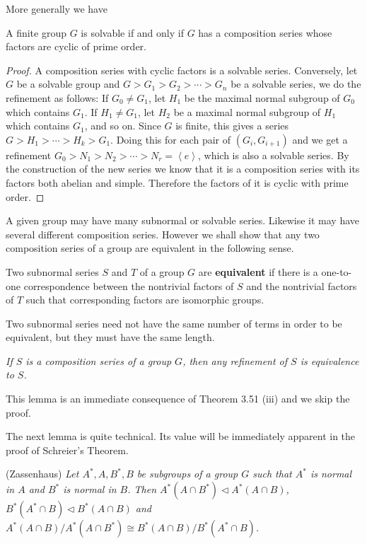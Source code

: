More generally we have 
\begin{proposition}
A finite group $G$ is solvable if and only if $G$ has a composition series whose factors are cyclic of prime order.
\end{proposition}
\begin{proof}
A composition series with cyclic factors is a solvable series. Conversely, let $G$ be a solvable group and $G>G_1>G_2>\cdots >G_n$ be a solvable series, we do the refinement as follows: If $G_0\ne G_1$, let $H_1$ be the maximal normal subgroup of $G_0$ which contains $G_1$. If $H_1\ne G_1$, let $H_2$ be a maximal normal subgroup of $H_1$ which contains $G_1$, and so on. Since $G$ is finite, this gives a series $G>H_1>\cdots >H_k>G_1$. Doing this for each pair of $(G_i,G_{i+1})$ and we get a refinement $G_0>N_1>N_2>\cdots >N_r=\left< e \right> $, which is also a solvable series. By the construction of the new series we know that it is a composition series with its factors both abelian and simple. Therefore the factors of it is cyclic with prime order.
\end{proof}
A given group may have many subnormal or solvable series. Likewise it may have several different composition series. However we shall show that any two composition series of a group are equivalent in the following sense.
\begin{definition}
Two subnormal series $S$ and $T$ of a group $G$ are \textbf{equivalent} if there is a one-to-one correspondence between the nontrivial factors of $S$ and the nontrivial factors of $T$ such that corresponding factors are isomorphic groups.
\end{definition}
Two subnormal series need not have the same number of terms in order to be equivalent, but they must have the same length.
\begin{lemma}\em
If $S$ is a composition series of a group $G$, then any refinement of $S$ is equivalence to $S$.
\end{lemma}
This lemma is an immediate consequence of Theorem 3.51 (iii) and we skip the proof.\par
The next lemma is quite technical. Its value will be immediately apparent in the proof of Schreier's Theorem.
\begin{lemma}(Zassenhaus)\em
Let $A^*,A,B^*,B$ be subgroups of a group $G$ such that $A^*$ is normal in $A$ and $B^*$ is normal in $B$. Then $A^*\left( A\cap B^* \right) \lhd A^*\left( A\cap B \right) $, $B^*\left( A^*\cap B \right) \lhd B^*\left( A\cap B \right) $ and $A^*\left( A\cap B \right) /A^*\left( A\cap B^* \right) \cong B^*\left( A\cap B \right) /B^*\left( A^*\cap B \right) $.
\end{lemma}
